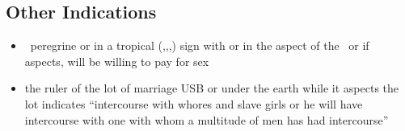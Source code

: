 \subsection{Other Indications}
\begin{itemize}
\item \Venus\, peregrine or in a tropical (\Aries,\Cancer,\Libra,\Capricorn) sign with or in the aspect of the \Moon\, or if \Saturn\, aspects, will be willing to pay for sex

\item the ruler of the lot of marriage USB or under the earth while it aspects the lot indicates ``intercourse with whores and slave girls or he will have intercourse with one with whom a multitude of men has had intercourse''

\end{itemize}

